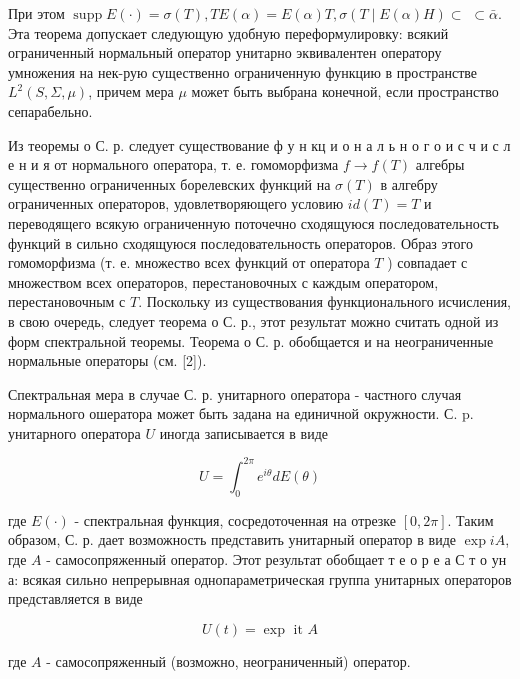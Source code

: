 \documentclass[10pt]{article}
\begin{document}
При этом $\operatorname{supp} E(\cdot)=\sigma(T), T E(\alpha)=E(\alpha) T, \sigma(T \mid E(\alpha) H) \subset$ $\subset \bar{\alpha}$. Эта теорема допускает следующую удобную переформулировку: всякий ограниченный нормальный оператор унитарно эквивалентен оператору умножения на нек-рую существенно ограниченную функцию в пространстве $L^{2}(S, \Sigma, \mu)$, причем мера $\mu$ может быть выбрана конечной, если пространство сепарабельно.



Из теоремы о С. р. следует существование ф у н кц и о н а л ь н о г о и с ч и с л е н и я от нормального оператора, т. е. гомоморфизма $f \rightarrow f(T)$ алгебры существенно ограниченных борелевских функций на $\sigma(T)$ в алгебру ограниченных операторов, удовлетворяющего условию $i d(T)=T$ и переводящего всякую ограниченную поточечно сходящуюся последовательность функций в сильно сходящуюся последовательность операторов. Образ этого гомоморфизма (т. е. множество всех функций от оператора $T$ ) совпадает с множеством всех операторов, перестановочных с каждым оператором, перестановочным с $T$. Поскольку из существования функционального исчисления, в свою очередь, следует теорема о С. р., этот результат можно считать одной из форм спектральной теоремы. Теорема о С. р. обобщается и на неограниченные нормальные операторы (см. [2]).



Спектральная мера в случае С. р. унитарного оператора - частного случая нормального ошератора может быть задана на единичной окружности. С. p. унитарного оператора $U$ иногда записывается в виде



\[

U=\int_{0}^{2 \pi} e^{i \theta} d E(\theta)

\]



где $E(\cdot)$ - спектральная функция, сосредоточенная на отрезке $[0,2 \pi]$. Таким образом, С. р. дает возможность представить унитарный оператор в виде $\exp i A$, где $A$ - самосопряженный оператор. Этот результат обобщает т е о р е а С т о ун а: всякая сильно непрерывная однопараметрическая группа унитарных операторов представляется в виде



\[

U(t)=\exp \text { it } A

\]



где $A$ - самосопряженный (возможно, неограниченный) оператор.
\end{document}

